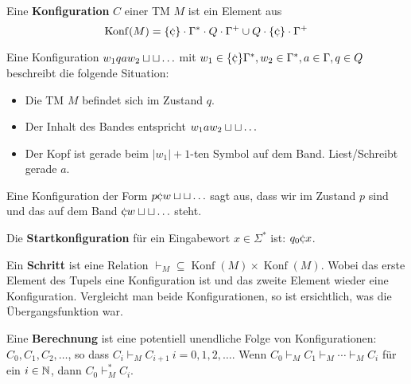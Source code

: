 \begin{definition}
Eine \textbf{Konfiguration} \(C\) einer TM \(M\) ist ein Element aus
\[
\operatorname{Konf}(M) = \{\stopsym\} \cdot \Gamma^* \cdot Q \cdot \Gamma^+ \cup Q \cdot \{\stopsym\} \cdot \Gamma^+
\]

Eine Konfiguration \(w_1qaw_2\sqcup\sqcup\ldots\) mit \(w_1 \in \{\stopsym\}\Gamma^*, w_2 \in \Gamma^*, a \in \Gamma, q \in Q\) beschreibt die folgende Situation:
\begin{itemize}
  \item Die TM \(M\) befindet sich im Zustand \(q\).
  \item Der Inhalt des Bandes entspricht \(w_1aw_2\sqcup\sqcup\ldots\)
  \item Der Kopf ist gerade beim \(|w_1| + 1\)-ten Symbol auf dem Band. Liest/Schreibt gerade \(a\).
\end{itemize}

Eine Konfiguration der Form \(p\stopsym w \emptysym\emptysym\ldots\) sagt aus, dass wir im Zustand \(p\) sind und das auf dem Band \(\stopsym w \emptysym\emptysym\ldots\) steht.\\

\end{definition}

\begin{definition}
Die \textbf{Startkonfiguration} für ein Eingabewort \(x \in \Sigma^*\) ist: \(q_0 \stopsym x\).\\
\end{definition}

\begin{definition}
Ein \textbf{Schritt} ist eine Relation \(\vdash_M \subseteq \operatorname{Konf}(M) \times \operatorname{Konf}(M)\). Wobei das erste Element des Tupels eine Konfiguration ist und das zweite Element wieder eine Konfiguration. Vergleicht man beide Konfigurationen, so ist ersichtlich, was die Übergangsfunktion war.\\
\end{definition}

\begin{definition}
Eine \textbf{Berechnung} ist eine potentiell unendliche Folge von Konfigurationen: \(C_0, C_1, C_2, \ldots\), so dass \(C_i \vdash_M C_{i+1} \ i = 0, 1, 2, \ldots\). Wenn \( C_0 \vdash_M C_1 \vdash_M \cdots \vdash_M C_i \) für ein \(i \in \mathbb{N}\), dann \(C_0 \vdash_M^* C_i\).\\
\end{definition}

